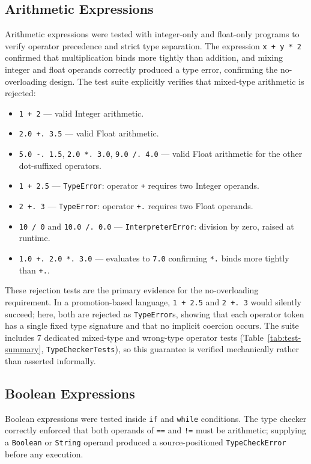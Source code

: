 \subsection{Arithmetic Expressions}
Arithmetic expressions were tested with integer-only and float-only programs to
verify operator precedence and strict type separation. The expression
\texttt{x + y * 2} confirmed that multiplication binds more tightly than
addition, and mixing integer and float operands correctly produced a type error,
confirming the no-overloading design. The test suite explicitly verifies that
mixed-type arithmetic is rejected:

\begin{itemize}[nosep]
  \item \texttt{1 + 2} --- valid Integer arithmetic.
  \item \texttt{2.0 +. 3.5} --- valid Float arithmetic.
  \item \texttt{5.0 -. 1.5}, \texttt{2.0 *. 3.0}, \texttt{9.0 /. 4.0} --- valid Float arithmetic for the other dot-suffixed operators.
  \item \texttt{1 + 2.5} --- \texttt{TypeError}: operator \texttt{+} requires two Integer operands.
  \item \texttt{2 +. 3} --- \texttt{TypeError}: operator \texttt{+.} requires two Float operands.
  \item \texttt{10 / 0} and \texttt{10.0 /. 0.0} --- \texttt{InterpreterError}: division by zero, raised at runtime.
  \item \texttt{1.0 +. 2.0 *. 3.0} --- evaluates to \texttt{7.0} confirming \texttt{*.} binds more tightly than \texttt{+.}.
\end{itemize}

These rejection tests are the primary evidence for the no-overloading
requirement. In a promotion-based language, \texttt{1 + 2.5} and
\texttt{2 +. 3} would silently succeed; here, both are rejected as
\texttt{TypeError}s, showing that each operator token has a single fixed type
signature and that no implicit coercion occurs. The suite includes 7 dedicated
mixed-type and wrong-type operator tests (Table~\ref{tab:test-summary},
\texttt{TypeCheckerTests}), so this guarantee is verified mechanically rather
than asserted informally.

\subsection{Boolean Expressions}
Boolean expressions were tested inside \texttt{if} and \texttt{while}
conditions. The type checker correctly enforced that both operands of
\texttt{==} and \texttt{!=} must be arithmetic; supplying a \texttt{Boolean}
or \texttt{String} operand produced a source-positioned \texttt{TypeCheckError}
before any execution.

